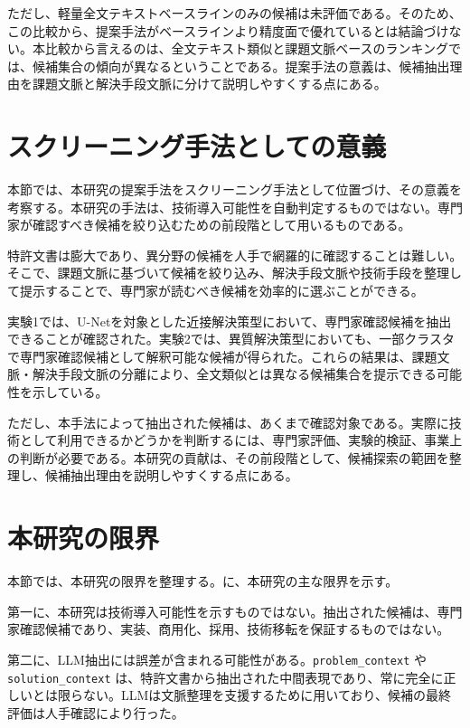 ただし、軽量全文テキストベースラインのみの候補は未評価である。そのため、この比較から、提案手法がベースラインより精度面で優れているとは結論づけない。本比較から言えるのは、全文テキスト類似と課題文脈ベースのランキングでは、候補集合の傾向が異なるということである。提案手法の意義は、候補抽出理由を課題文脈と解決手段文脈に分けて説明しやすくする点にある。

\section{スクリーニング手法としての意義}

本節では、本研究の提案手法をスクリーニング手法として位置づけ、その意義を考察する。本研究の手法は、技術導入可能性を自動判定するものではない。専門家が確認すべき候補を絞り込むための前段階として用いるものである。

特許文書は膨大であり、異分野の候補を人手で網羅的に確認することは難しい。そこで、課題文脈に基づいて候補を絞り込み、解決手段文脈や技術手段を整理して提示することで、専門家が読むべき候補を効率的に選ぶことができる。

実験1では、U-Netを対象とした近接解決策型において、専門家確認候補を抽出できることが確認された。実験2では、異質解決策型においても、一部クラスタで専門家確認候補として解釈可能な候補が得られた。これらの結果は、課題文脈・解決手段文脈の分離により、全文類似とは異なる候補集合を提示できる可能性を示している。

ただし、本手法によって抽出された候補は、あくまで確認対象である。実際に技術として利用できるかどうかを判断するには、専門家評価、実験的検証、事業上の判断が必要である。本研究の貢献は、その前段階として、候補探索の範囲を整理し、候補抽出理由を説明しやすくする点にある。

\section{本研究の限界}




本節では、本研究の限界を整理する。に、本研究の主な限界を示す。

第一に、本研究は技術導入可能性を示すものではない。抽出された候補は、専門家確認候補であり、実装、商用化、採用、技術移転を保証するものではない。

第二に、LLM抽出には誤差が含まれる可能性がある。\texttt{problem\_context} や \texttt{solution\_context} は、特許文書から抽出された中間表現であり、常に完全に正しいとは限らない。LLMは文脈整理を支援するために用いており、候補の最終評価は人手確認により行った。

